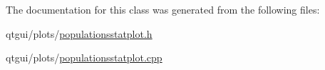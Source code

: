 The documentation for this class was generated from the following files\+:\begin{DoxyCompactItemize}
\item 
qtgui/plots/\mbox{\hyperlink{populationsstatplot_8h}{populationsstatplot.\+h}}\item 
qtgui/plots/\mbox{\hyperlink{populationsstatplot_8cpp}{populationsstatplot.\+cpp}}\end{DoxyCompactItemize}
